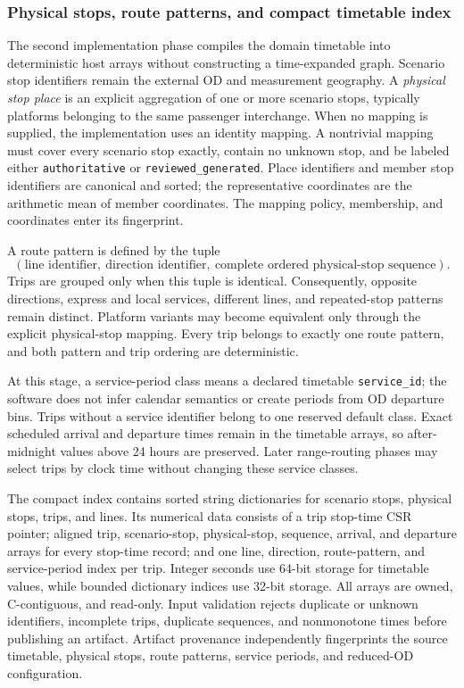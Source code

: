 \subsubsection{Physical stops, route patterns, and compact timetable index}
\label{sec:reduced-od-phase-two-timetable}

The second implementation phase compiles the domain timetable into
deterministic host arrays without constructing a time-expanded graph.  Scenario
stop identifiers remain the external OD and measurement geography.  A
\emph{physical stop place} is an explicit aggregation of one or more scenario
stops, typically platforms belonging to the same passenger interchange.  When
no mapping is supplied, the implementation uses an identity mapping.  A
nontrivial mapping must cover every scenario stop exactly, contain no unknown
stop, and be labeled either \texttt{authoritative} or
\texttt{reviewed\_generated}.  Place identifiers and member stop identifiers
are canonical and sorted; the representative coordinates are the arithmetic
mean of member coordinates.  The mapping policy, membership, and coordinates
enter its fingerprint.

A route pattern is defined by the tuple
\[
(\text{line identifier},\ \text{direction identifier},\
  \text{complete ordered physical-stop sequence}).
\]
Trips are grouped only when this tuple is identical.  Consequently, opposite
directions, express and local services, different lines, and repeated-stop
patterns remain distinct.  Platform variants may become equivalent only
through the explicit physical-stop mapping.  Every trip belongs to exactly one
route pattern, and both pattern and trip ordering are deterministic.

At this stage, a service-period class means a declared timetable
\texttt{service\_id}; the software does not infer calendar semantics or create
periods from OD departure bins.  Trips without a service identifier belong to
one reserved default class.  Exact scheduled arrival and departure times remain
in the timetable arrays, so after-midnight values above 24 hours are preserved.
Later range-routing phases may select trips by clock time without changing
these service classes.

The compact index contains sorted string dictionaries for scenario stops,
physical stops, trips, and lines.  Its numerical data consists of a trip
stop-time CSR pointer; aligned trip, scenario-stop, physical-stop, sequence,
arrival, and departure arrays for every stop-time record; and one line,
direction, route-pattern, and service-period index per trip.  Integer seconds
use 64-bit storage for timetable values, while bounded dictionary indices use
32-bit storage.  All arrays are owned, C-contiguous, and read-only.  Input
validation rejects duplicate or unknown identifiers, incomplete trips,
duplicate sequences, and nonmonotone times before publishing an artifact.
Artifact provenance independently fingerprints the source timetable, physical
stops, route patterns, service periods, and reduced-OD configuration.


